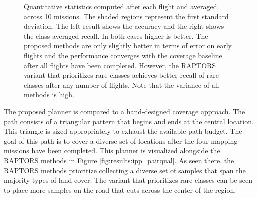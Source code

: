 \begin{figure}
    \hfill
    \hfill
    \caption{Quantitative statistics computed after each flight and averaged across 10 missions. The shaded regions represent the first standard deviation. The left result shows the accuracy and the right shows the class-averaged recall. In both cases higher is better. The proposed methods are only slightly better in terms of error on early flights and the performance converges with the coverage baseline after all flights have been completed. However, the RAPTORS variant that prioritizes rare classes achieves better recall of rare classes after any number of flights. Note that the variance of all methods is high.}
    \label{fig:results:ipp_quant}
\end{figure}

The proposed planner is compared to a hand-designed coverage approach. The path consists of a triangular pattern that begins and ends at the central location. This triangle is sized appropriately to exhaust the available path budget. The goal of this path is to cover a diverse set of locations after the four mapping missions have been completed. This planner is visualized alongside the RAPTORS methods in Figure \ref{fig:results:ipp_pairqual}. As seen there, the RAPTORS methods prioritize collecting a diverse set of samples that span the majority types of land cover. The variant that prioritizes rare classes can be seen to place more samples on the road that cuts across the center of the region.


